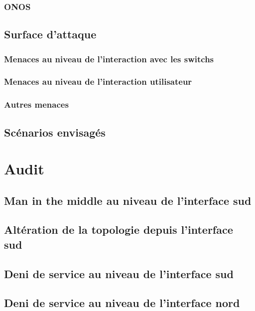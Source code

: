 \documentclass[11pt]{article}
\begin{document}
		\subsubsection{ONOS}
			
	\subsection{Surface d'attaque}
		
		\subsubsection{Menaces au niveau de l'interaction avec les switchs}
			
		\subsubsection{Menaces au niveau de l'interaction utilisateur}
			
		\subsubsection{Autres menaces}
			
	\subsection{Scénarios envisagés}
		
\newpage
{}
\section{Audit}
	\subsection{Man in the middle au niveau de l'interface sud}
		
		\newpage
	\subsection{Altération de la topologie depuis l'interface sud}
		
		\newpage
	\subsection{Deni de service au niveau de l'interface sud}
		
		\newpage
	\subsection{Deni de service au niveau de l'interface nord}
		
		\newpage
\end{document}
